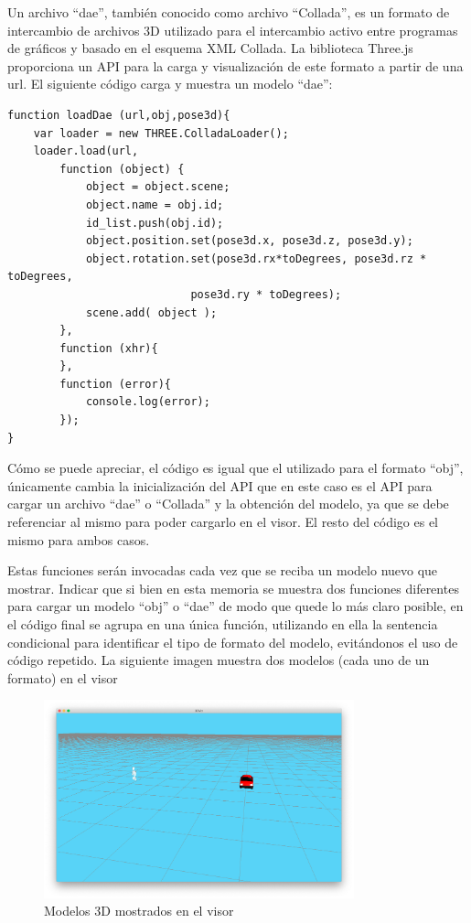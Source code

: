 \begin{itemize}
{Un archivo ``dae'', también conocido como archivo ``Collada'', es un formato de intercambio de archivos 3D utilizado para el intercambio activo entre programas de gráficos y basado en el esquema XML Collada. La biblioteca Three.js proporciona un API para la carga y visualización de este formato a partir de una url. El siguiente código carga y muestra un modelo ``dae'':
\begin{lstlisting}[frame=single]
function loadDae (url,obj,pose3d){
	var loader = new THREE.ColladaLoader();
	loader.load(url, 
		function (object) {
			object = object.scene;
			object.name = obj.id;
			id_list.push(obj.id);
			object.position.set(pose3d.x, pose3d.z, pose3d.y);
			object.rotation.set(pose3d.rx*toDegrees, pose3d.rz * toDegrees, 
							pose3d.ry * toDegrees);
			scene.add( object );		
		},
		function (xhr){
		},
		function (error){
			console.log(error);
		});
}
\end{lstlisting}
Cómo se puede apreciar, el código es igual que el utilizado para el formato ``obj'', únicamente cambia la inicialización del API que en este caso es el API para cargar un archivo ``dae'' o ``Collada'' y la obtención del modelo, ya que se debe referenciar al mismo para poder cargarlo en el visor. El resto del código es el mismo para ambos casos.}
\end{itemize}
Estas funciones serán invocadas cada vez que se reciba un modelo nuevo que mostrar. Indicar que si bien en esta memoria se muestra dos funciones diferentes para cargar un modelo ``obj'' o ``dae'' de modo que quede lo más claro posible, en el código final se agrupa en una única función, utilizando en ella la sentencia condicional para identificar el tipo de formato del modelo, evitándonos el uso de código repetido. La siguiente imagen muestra dos modelos (cada uno de un formato) en el visor

\begin{figure}[H]
  \begin{center}
    \includegraphics[width=0.8\textwidth]{figures/visualizarmodel.png}
		\caption{Modelos 3D mostrados en el visor}
		\label{fig.visualizarmodel}
		\end{center}
\end{figure}
